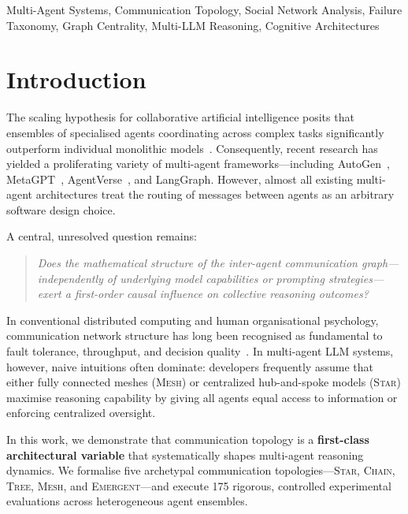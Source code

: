 \documentclass[conference]{IEEEtran}
\newcommand{\topo}[1]{\textsc{#1}}  %
\begin{document}
\begin{IEEEkeywords}
Multi-Agent Systems, Communication Topology, Social Network Analysis, Failure Taxonomy, Graph Centrality, Multi-LLM Reasoning, Cognitive Architectures
\end{IEEEkeywords}

\section{Introduction}
\label{sec:intro}

The scaling hypothesis for collaborative artificial intelligence posits that ensembles of specialised agents coordinating across complex tasks significantly outperform individual monolithic models~\cite{liang2023encouraging,du2023improving}. Consequently, recent research has yielded a proliferating variety of multi-agent frameworks—including AutoGen~\cite{wu2023autogen}, MetaGPT~\cite{hong2023metagpt}, AgentVerse~\cite{chen2023agentverse}, and LangGraph. However, almost all existing multi-agent architectures treat the routing of messages between agents as an arbitrary software design choice. 

A central, unresolved question remains:
\begin{quote}
\emph{Does the mathematical structure of the inter-agent communication graph—independently of underlying model capabilities or prompting strategies—exert a first-order causal influence on collective reasoning outcomes?}
\end{quote}

In conventional distributed computing and human organisational psychology, communication network structure has long been recognised as fundamental to fault tolerance, throughput, and decision quality~\cite{kleinrock1975queueing,parnas1972decomposition}. In multi-agent LLM systems, however, naive intuitions often dominate: developers frequently assume that either fully connected meshes (\topo{Mesh}) or centralized hub-and-spoke models (\topo{Star}) maximise reasoning capability by giving all agents equal access to information or enforcing centralized oversight.

In this work, we demonstrate that communication topology is a \textbf{first-class architectural variable} that systematically shapes multi-agent reasoning dynamics. We formalise five archetypal communication topologies—\topo{Star}, \topo{Chain}, \topo{Tree}, \topo{Mesh}, and \topo{Emergent}—and execute 175 rigorous, controlled experimental evaluations across heterogeneous agent ensembles. 
\end{document}
